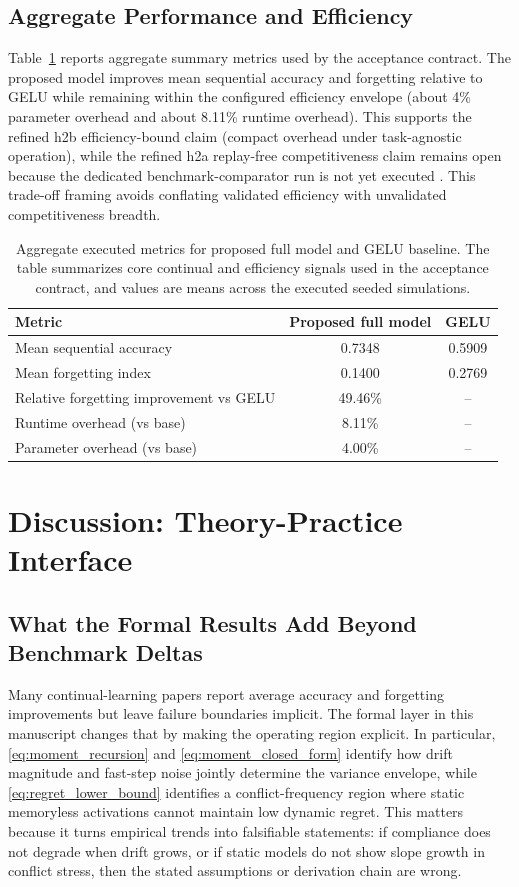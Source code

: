 \documentclass{article} %
\begin{document}
\subsection{Aggregate Performance and Efficiency}
Table~\ref{tab:aggregate_metrics} reports aggregate summary metrics used by the acceptance contract. The proposed model improves mean sequential accuracy and forgetting relative to GELU while remaining within the configured efficiency envelope (about 4\% parameter overhead and about 8.11\% runtime overhead). This supports the refined h2b efficiency-bound claim (compact overhead under task-agnostic operation), while the refined h2a replay-free competitiveness claim remains open because the dedicated benchmark-comparator run is not yet executed \citep{s12,s38}. This trade-off framing avoids conflating validated efficiency with unvalidated competitiveness breadth.

\begin{table}[t]
\caption{Aggregate executed metrics for proposed full model and GELU baseline. The table summarizes core continual and efficiency signals used in the acceptance contract, and values are means across the executed seeded simulations.}
\label{tab:aggregate_metrics}
\centering
\small
\renewcommand{\arraystretch}{1.1}
\setlength{\tabcolsep}{4pt}
\begin{tabular}{lcc}
\hline
Metric & Proposed full model & GELU \\
\hline
Mean sequential accuracy & 0.7348 & 0.5909 \\
Mean forgetting index & 0.1400 & 0.2769 \\
Relative forgetting improvement vs GELU & 49.46\% & -- \\
Runtime overhead (vs base) & 8.11\% & -- \\
Parameter overhead (vs base) & 4.00\% & -- \\
\hline
\end{tabular}
\end{table}

\section{Discussion: Theory-Practice Interface}
\subsection{What the Formal Results Add Beyond Benchmark Deltas}
Many continual-learning papers report average accuracy and forgetting improvements but leave failure boundaries implicit. The formal layer in this manuscript changes that by making the operating region explicit. In particular, \eqref{eq:moment_recursion} and \eqref{eq:moment_closed_form} identify how drift magnitude and fast-step noise jointly determine the variance envelope, while \eqref{eq:regret_lower_bound} identifies a conflict-frequency region where static memoryless activations cannot maintain low dynamic regret. This matters because it turns empirical trends into falsifiable statements: if compliance does not degrade when drift grows, or if static models do not show slope growth in conflict stress, then the stated assumptions or derivation chain are wrong.
\end{document}
